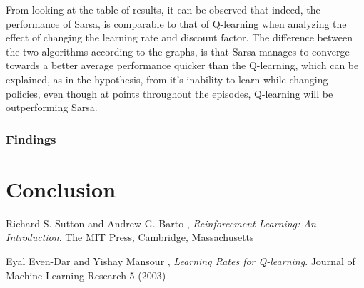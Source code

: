 \documentclass[11pt]{article}
\begin{document}
From looking at the table of results, it can be observed that indeed, the performance of Sarsa, is comparable to that of Q-learning when analyzing the effect of changing the learning rate and discount factor. The difference between the two algorithms according to the graphs, is that Sarsa manages to converge towards a better average performance quicker than the Q-learning, which can be explained, as in the hypothesis, from it's inability to learn while changing policies, even though at points throughout the episodes, Q-learning will be outperforming Sarsa.
\subsubsection{Findings}









\section{Conclusion}

\begin{thebibliography}{9}

  Richard S. Sutton and Andrew G. Barto ,
  \emph{Reinforcement Learning: An Introduction}.
  The MIT Press, Cambridge, Massachusetts

  Eyal Even-Dar and Yishay Mansour ,
  \emph{Learning Rates for Q-learning}.
  Journal of Machine Learning Research 5 (2003)

\end{thebibliography}
\end{document}
